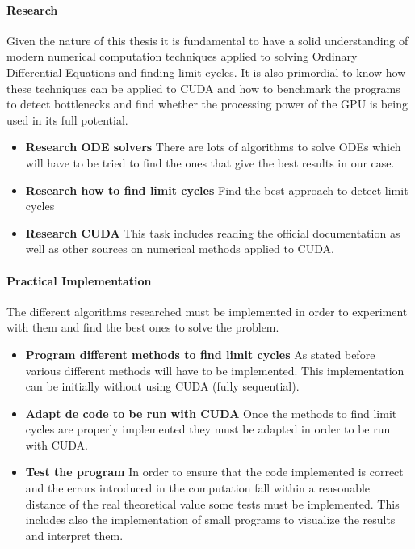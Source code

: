 \paragraph{Research}

Given the nature of this thesis it is fundamental to have a solid understanding
of modern numerical computation techniques applied to solving Ordinary
Differential Equations and finding limit cycles. It is also primordial to know
how these techniques can be applied to CUDA and how to benchmark the programs to
detect bottlenecks and find whether the processing power of the GPU is
being used in its full potential.

\begin{itemize}
    \item \textbf{Research ODE solvers} There are lots of algorithms to solve
        ODEs which will have to be tried to find the ones that give the best
        results in our case.
    \item \textbf{Research how to find limit cycles} Find the best approach to
        detect limit cycles
    \item \textbf{Research CUDA} This task includes reading the official
        documentation as well as other sources on numerical methods applied to
        CUDA.
\end{itemize}

\paragraph{Practical Implementation}

The different algorithms researched must be implemented in order to experiment
with them and find the best ones to solve the problem.

\begin{itemize}
    \item \textbf{Program different methods to find limit cycles} As stated
        before various different methods will have to be implemented. This
        implementation can be initially without using CUDA (fully sequential).
    \item \textbf{Adapt de code to be run with CUDA} Once the methods to find
        limit cycles are properly implemented they must be adapted in order to
        be run with CUDA.
    \item \textbf{Test the program} In order to ensure that the code implemented
        is correct and the errors introduced in the computation fall within a
        reasonable distance of the real theoretical value some tests must be
        implemented. This includes also the implementation of small programs to
        visualize the results and interpret them.
\end{itemize}

